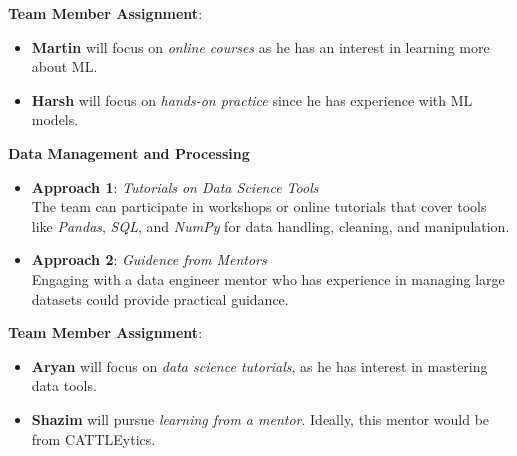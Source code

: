 \documentclass[12pt]{article}
\begin{document}
\textbf{Team Member Assignment}:
\begin{itemize}
    \item \textbf{Martin} will focus on \textit{online courses} as he has an 
    interest in learning more about ML.
    \item \textbf{Harsh} will focus on \textit{hands-on practice} since he has 
    experience with ML models.
\end{itemize}

\textbf{Data Management and Processing}

\begin{itemize}
    \item \textbf{Approach 1}: \textit{Tutorials on Data Science Tools} \\
    The team can participate in workshops or online tutorials that cover tools 
    like \textit{Pandas}, \textit{SQL}, and \textit{NumPy} for data handling, 
    cleaning, and manipulation.
    \item \textbf{Approach 2}: \textit{Guidence from Mentors} \\
    Engaging with a data engineer mentor who has experience in managing large 
    datasets could provide practical guidance. 
\end{itemize}

\textbf{Team Member Assignment}:
\begin{itemize}
    \item \textbf{Aryan} will focus on \textit{data science tutorials}, as he 
    has interest in mastering data tools.
    \item \textbf{Shazim} will pursue \textit{learning from a mentor}. Ideally, 
    this mentor would be from CATTLEytics.
\end{itemize}
\end{document}
